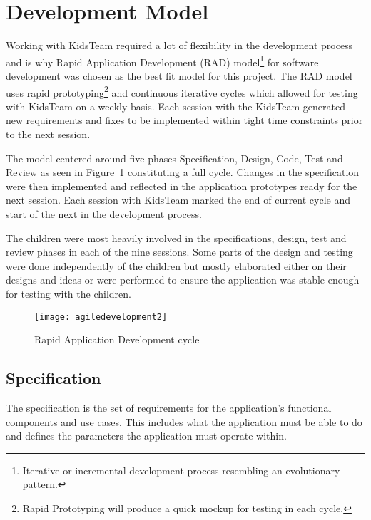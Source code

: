 \section{Development Model}
Working with KidsTeam required a lot of flexibility in the development process and is why Rapid Application Development (RAD) model\footnote{Iterative or incremental development process resembling an evolutionary pattern.} for software development was chosen as the best fit model for this project. The RAD model uses rapid prototyping\footnote{Rapid Prototyping will produce a quick mockup for testing in each cycle.} and continuous iterative cycles which allowed for testing with KidsTeam on a weekly basis. Each session with the KidsTeam generated new requirements and fixes to be implemented within tight time constraints prior to the next session.

The model centered around five phases Specification, Design, Code, Test and Review as seen in Figure~\ref{fig:agiledesignprocess} constituting a full cycle. Changes in the specification were then implemented and reflected in the application prototypes ready for the next session. Each session with KidsTeam marked the end of current cycle and start of the next in the development process. \cite{0136061699}\cite{Ruparelia:2010:SDL:1764810.1764814}

The children were most heavily involved in the specifications, design, test and review phases in each of the nine sessions. Some parts of the design and testing were done independently of the children but mostly elaborated either on their designs and ideas or were performed to ensure the application was stable enough for testing with the children.  

\begin{figure}
\centering
\texttt{[image: agiledevelopment2]}
\caption{Rapid Application Development cycle \cite{Ruparelia:2010:SDL:1764810.1764814} }
\label{fig:agiledesignprocess}
\end{figure}


\subsection{Specification}\label{sec:specificationphase}
The specification is the set of requirements for the application's functional components and use cases. This includes what the application must be able to do and defines the parameters the application must operate within. 

